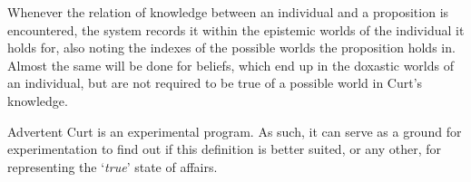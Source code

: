 \documentclass[notitlepage,twoside,a4paper]{scrreprt}
\newcommand{\term}[1]{\textsf{\textbf{#1}}} %
\newcommand{\code}[1]{\texttt{#1}} %
\newcommand{\pn}{\textsf} %
\newcommand{\example}[1]{`\textit{#1}'} %
\newcommand{\curt}{\pn{Curt}}
\newcommand{\acurt}{\pn{Advertent Curt}}
\theoremstyle{remark}
\theoremstyle{remark}
\theoremstyle{definition}
\newtheorem{definition}[thm]{Definition}
\theoremstyle{definition}
\begin{document}
Whenever the relation of knowledge between an individual and a proposition is
encountered, the system records it within the epistemic worlds of the
individual it holds for, also noting the indexes of the possible worlds the
proposition holds in. Almost the same will be done for beliefs, which end up in
the doxastic worlds of an individual, but are not required to be true of a
possible world in \curt's knowledge.

\acurt{} is an experimental program. As such, it can serve as a ground for
experimentation to find out if this definition is better suited, or any other,
for representing the \example{true} state of affairs.








\end{document}
